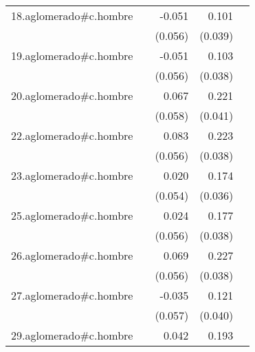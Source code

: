 {\begin{longtable}{l*{4}{D{.}{.}{-1}}}
\addlinespace
18.aglomerado#c.hombre&                     &      -0.051         &       0.101\sym{**} &                     \\
            &                     &     (0.056)         &     (0.039)         &                     \\
\addlinespace
19.aglomerado#c.hombre&                     &      -0.051         &       0.103\sym{**} &                     \\
            &                     &     (0.056)         &     (0.038)         &                     \\
\addlinespace
20.aglomerado#c.hombre&                     &       0.067         &       0.221\sym{***}&                     \\
            &                     &     (0.058)         &     (0.041)         &                     \\
\addlinespace
22.aglomerado#c.hombre&                     &       0.083         &       0.223\sym{***}&                     \\
            &                     &     (0.056)         &     (0.038)         &                     \\
\addlinespace
23.aglomerado#c.hombre&                     &       0.020         &       0.174\sym{***}&                     \\
            &                     &     (0.054)         &     (0.036)         &                     \\
\addlinespace
25.aglomerado#c.hombre&                     &       0.024         &       0.177\sym{***}&                     \\
            &                     &     (0.056)         &     (0.038)         &                     \\
\addlinespace
26.aglomerado#c.hombre&                     &       0.069         &       0.227\sym{***}&                     \\
            &                     &     (0.056)         &     (0.038)         &                     \\
\addlinespace
27.aglomerado#c.hombre&                     &      -0.035         &       0.121\sym{**} &                     \\
            &                     &     (0.057)         &     (0.040)         &                     \\
\addlinespace
29.aglomerado#c.hombre&                     &       0.042         &       0.193\sym{***}&                     \\

\end{longtable}}

